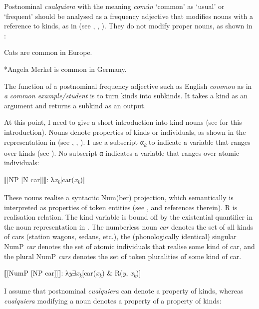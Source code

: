 \documentclass[output=paper]{langscibook}
\begin{document}
  Postnominal \textit{cualquiera} with the meaning \textit{común} ‘common’ as ‘usual’ or ‘frequent’ should be analysed as a frequency adjective that modifies nouns with a reference to kinds, as in  (see \citealt{Carlson1977}, \citealt{Chierchia1998}, \citealt{GehrkeMcNally2015}). They do not modify proper nouns, as shown in :

\label{bkm:Ref72354905}  Cats are common in Europe.

\label{bkm:Ref72354921}  *Angela Merkel is common in Germany.

The function of a postnominal frequency adjective such as English \textit{common} as in \textit{a} \textit{common example/student} is to turn kinds into subkinds. It takes a kind as an argument and returns a subkind as an output. 

  At this point, I need to give a short introduction into kind nouns (see \citealt{GehrkeMcNally2015} for this introduction). Nouns denote properties of kinds or individuals, as shown in the representation in  (see \citealt{Carlson1977}, \citealt{Chierchia1998}, \citealt{GehrkeMcNally2015}). I use a subscript α\textit{\textsubscript{k}} to indicate a variable that ranges over kinds (see \citealt{GehrkeMcNally2015}). No subscript α indicates a variable that ranges over atomic individuals:

\label{bkm:Ref42889594}  ⟦[NP [N car]]⟧: λ\textit{x\textsubscript{k}}[car(\textit{x\textsubscript{k}})] 

These nouns realise a syntactic Num(ber) projection, which semantically is interpreted as properties of token entities (see \citealt{GehrkeMcNally2015}, and references therein). R is  realisation relation. The kind variable is bound off by the existential quantifier in the noun representation in . The numberless noun \textit{car} denotes the set of all kinds of cars (station wagons, sedans, etc.), the (phonologically identical) singular NumP \textit{car} denotes the set of atomic individuals that realise some kind of car, and the plural NumP \textit{cars} denotes the set of token pluralities of some kind of car.

\label{bkm:Ref42889808}  ⟦[NumP [NP car]]⟧: λ\textit{y}${\exists}$\textit{x\textsubscript{k}}[car(\textit{x\textsubscript{k}}) \& R(\textit{y}, \textit{x\textsubscript{k}})]

I assume that postnominal \textit{cualquiera} can denote a property of kinds, whereas \textit{cualquiera} modifying a noun denotes a property of a property of kinds:
\end{document}
